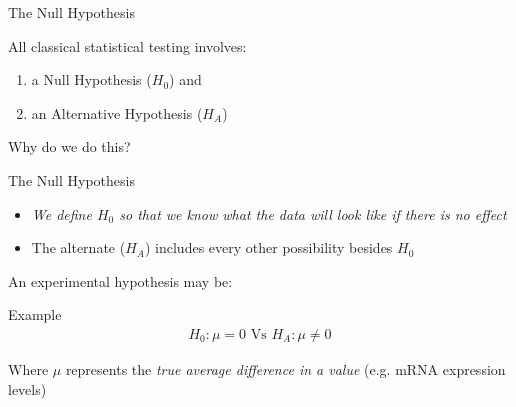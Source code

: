 \documentclass[aspectratio=169,11pt]{beamer}
\begin{document}
\begin{frame}{The Null Hypothesis}

 All classical statistical testing involves:
 
 	\begin{enumerate}
			\item a Null Hypothesis ($H_0$) and
			\item an Alternative Hypothesis ($H_A$)
	\end{enumerate}


Why do we do this?
\end{frame}

\begin{frame}{The Null Hypothesis}

	\begin{itemize}
		\item \textit{We define $H_0$ so that we know what the data will look like if there is no effect}
		\item The alternate ($H_A$) includes every other possibility besides $H_0$
	\end{itemize}

An experimental hypothesis may be:\\[3mm]
\begin{block}{Example}
	\begin{align*}
	H_0:\mu=0 \text{ Vs } H_A:\mu \neq 0
	\end{align*} 
	
Where $\mu$ represents the \textit{true average difference in a value }(e.g. mRNA expression levels)

\end{block}




\end{frame}
\end{document}
